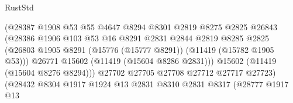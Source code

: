 \begin{lexlean}{RustStd}
\begin{coremodule}
                                          (@28387
                                            @1908
                                            @53
                                            @55
                                            @4647
                                            @8294
                                            @8301
                                            @2819
                                            @8275
                                            @2825
                                            @26843
                                            (@28386
                                              @1906
                                              @103
                                              @53
                                              @16
                                              @8291
                                              @2831
                                              @2844
                                              @2819
                                              @8285
                                              @2825
                                              (@26803
                                                @1905
                                                @8291
                                                (@15776 (@15777 @8291))
                                                (@11419 (@15782 @1905 @53)))
                                              @26771
                                              @15602
                                              (@11419 (@15604 @8286 @2831)))
                                            @15602
                                            (@11419 (@15604 @8276 @8294)))
                                          @27702
                                          @27705
                                          @27708
                                          @27712
                                          @27717
                                          @27723)
                                        (@28432
                                          @8304
                                          @1917
                                          @1924
                                          @13
                                          @2831
                                          @8310
                                          @2831
                                          @8317
                                          (@28777
                                            @1917
                                            @13

\end{coremodule}
\end{lexlean}
